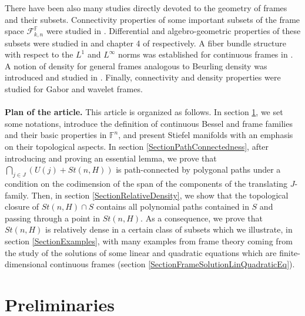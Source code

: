 \documentclass[a4paper,12pt]{article}
\theoremstyle{plain}
\theoremstyle{definition}
\theoremstyle{remark}
\begin{document}
There have been also many studies directly devoted to the geometry of frames and their subsets. Connectivity properties of some important subsets of the frame space $\mathcal{F}_{k,n}^\mathbb{F}$ were studied in \cite{CahillMixonStrawn, NeedhamShonkwiler}. Differential and algebro-geometric properties of these subsets were studied in \cite{DykemaStrawn, Strawn1, Strawn2, Strawn3} and chapter 4 of \cite{CasazzaKutyniok} respectively. A fiber bundle structure with respect to the $L^1$ and $L^\infty$ norms was established for continuous frames in \cite{Agrawal, AgrawalKnisley}. A notion of density for general frames analogous to Beurling density was introduced and studied in \cite{BalanCasazzaHeilLandau1}. Finally, connectivity and density properties were studied for Gabor \cite{BalanCasazzaHeilLandau2, ChristensenDengHeil, Heil, LabateWilson} and wavelet \cite{Bownik, GarrigosHernandezSikicSoriaWeissWilson, HanLarson, Speegle} frames. \\ \\
\textbf{Plan of the article.} This article is organized as follows. In section \ref{SectionPreliminaries}, we set some notations, introduce the definition of continuous Bessel and frame families and their basic properties in $\mathbb{F}^n$, and present Stiefel manifolds with an emphasis on their topological aspects. In section \ref{SectionPathConnectedness}, after introducing and proving an essential lemma, we prove that $\bigcap_{j \in J} \left( U(j) + St(n,H) \right)$ is path-connected by polygonal paths under a condition on the codimension of the span of the components of the translating $J$-family. Then, in section \ref{SectionRelativeDensity}, we show that the topological closure of $St(n,H) \cap S$ contains all polynomial paths contained in $S$ and passing through a point in $St(n,H)$. As a consequence, we prove that $St(n,H)$ is relatively dense in a certain class of subsets which we illustrate, in section \ref{SectionExamples}, with many examples from frame theory coming from the study of the solutions of some linear and quadratic equations which are finite-dimensional continuous frames (section \ref{SectionFrameSolutionLinQuadraticEq}).











\section{Preliminaries}
\label{SectionPreliminaries}
\end{document}
